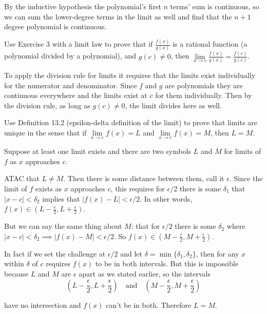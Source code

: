 \documentclass{article}
\begin{document}
By the inductive hypothesis the polynomial's first $n$ terms' sum is continuous, so we can sum the lower-degree terms in the limit as well and find that the $n+1$ degree polynomial is continuous.

\begin{problem}
Use Exercise 3 with a limit law to prove that if $\frac{f(x)}{g(x)}$ is a rational function (a polynomial divided by a polynomial), and $g(c) \neq 0$, then $\lim\limits_{x \to c} \frac{f(x)}{g(x)} = \frac{f(c)}{g(c)}$.
\end{problem}

To apply the division rule for limits it requires that the limits exist individually for the numerator and denominator. Since $f$ and $g$ are polynomials they are continuous everywhere and the limits exist at $c$ for them individually. Then by the division rule, as long as $g(c) \neq 0$, the limit divides here as well.

\begin{problem}
Use Definition 13.2 (epsilon-delta definition of the limit) to prove that limits are unique in the sense that if $\lim\limits_{x \to c} f(x) = L$ and $\lim\limits_{x \to c} f(x) = M$, then $L = M$.
\end{problem}

Suppose at least one limit exists and there are two symbols $L$ and $M$ for limits of $f$ as $x$ approaches $c$.

ATAC that $L \neq M$. Then there is some distance between them, call it $\epsilon$. Since the limit of $f$ exists as $x$ approaches $c$, this requires for $\epsilon / 2$ there is some $\delta_1$ that $|x - c| < \delta_2$ implies that $|f(x) - L| < \epsilon/2$. In other words, $f(x) \in (L - \frac{\epsilon}{2}, L + \frac{\epsilon}{2})$.

But we can say the same thing about $M$: that for $\epsilon / 2$ there is some $\delta_2$ where $|x - c| < \delta_2 \implies |f(x) - M| < \epsilon / 2$. So $f(x) \in (M - \frac{\epsilon}{2}, M + \frac{\epsilon}{2})$.

In fact if we set the challenge at $\epsilon / 2$ and let $\delta = \min\{\delta_1, \delta_2\}$, then for any $x$ within $\delta$ of $c$ requires $f(x)$ to be in both intervals. But this is impossible because $L$ and $M$ are $\epsilon$ apart as we stated earlier, so the intervals
$$\left(L - \frac{\epsilon}{2}, L + \frac{\epsilon}{2}\right) \quad \text{and} \quad \left(M - \frac{\epsilon}{2}, M + \frac{\epsilon}{2}\right)$$

have no intersection and $f(x)$ can't be in both. Therefore $L = M$.
\end{document}
